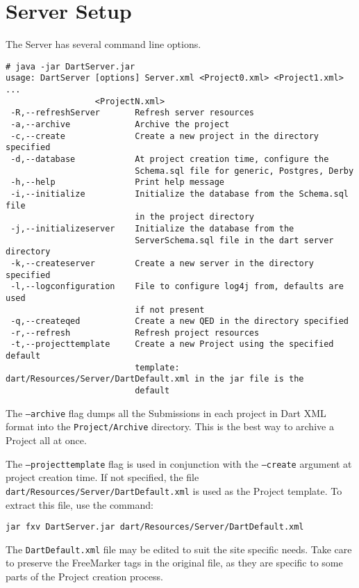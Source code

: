 \documentclass{InsightBook}
\newcommand{\filename}[1]{\texttt{#1}}
\begin{document}
\section{Server Setup}
\label{Section:ServerSetup}
The Server has several command line options.
\begin{verbatim}
# java -jar DartServer.jar
usage: DartServer [options] Server.xml <Project0.xml> <Project1.xml> ...
                  <ProjectN.xml>
 -R,--refreshServer       Refresh server resources
 -a,--archive             Archive the project
 -c,--create              Create a new project in the directory specified
 -d,--database            At project creation time, configure the
                          Schema.sql file for generic, Postgres, Derby
 -h,--help                Print help message
 -i,--initialize          Initialize the database from the Schema.sql file
                          in the project directory
 -j,--initializeserver    Initialize the database from the
                          ServerSchema.sql file in the dart server directory
 -k,--createserver        Create a new server in the directory specified
 -l,--logconfiguration    File to configure log4j from, defaults are used
                          if not present
 -q,--createqed           Create a new QED in the directory specified
 -r,--refresh             Refresh project resources
 -t,--projecttemplate     Create a new Project using the specified default
                          template: dart/Resources/Server/DartDefault.xml in the jar file is the
                          default
\end{verbatim}

The \texttt{--archive} flag dumps all the Submissions in each project
in Dart XML format into the \texttt{Project/Archive} directory.  This
is the best way to archive a Project all at once.

The \texttt{--projecttemplate} flag is used in conjunction with the
\texttt{--create} argument at project creation time.  If not
specified, the file \filename{dart/Resources/Server/DartDefault.xml} is
used as the Project template.  To extract this file, use the command:
\begin{verbatim}
jar fxv DartServer.jar dart/Resources/Server/DartDefault.xml
\end{verbatim}

The \filename{DartDefault.xml} file may be edited to suit the site
specific needs.  Take care to preserve the FreeMarker tags in the
original file, as they are specific to some parts of the Project creation process.
\end{document}
